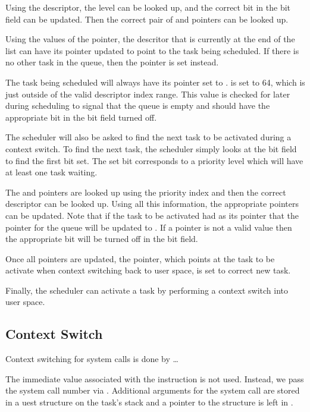 \documentclass[pdftex,10pt,a4paper]{article}
\begin{document}
Using the descriptor, the  level can be looked up, and
the correct bit in the bit field can be updated. Then the correct pair
of  and  pointers can be looked up.

Using the values of the  pointer, the descritor that is
currently at the end of the list can have its  pointer
updated to point to the task being scheduled. If there is no other
task in the queue, then the  pointer is set instead.

The task being scheduled will always have its  pointer set
to .  is set to 64, which is just
outside of the valid descriptor index range. This value is checked for
later during scheduling to signal that the queue is empty and should
have the appropriate bit in the bit field turned off.

The scheduler will also be asked to find the next task to be
activated during a context switch. To find the next task, the
scheduler simply looks at the bit field to find the first bit set. The
set bit corresponds to a priority level which will have at least one
task waiting.

The  and  pointers are looked up using the
priority index and then the correct descriptor can be looked up. Using
all this information, the appropriate pointers can be updated. Note
that if the task to be activated had  as its 
pointer that the  pointer for the queue will be updated to
. If a  pointer is not a valid value then the
appropriate bit will be turned off in the bit field.

Once all pointers are updated, the  pointer, which
points at the task to be activate when context switching back to user
space, is set to correct new task.

Finally, the scheduler can activate a task by performing a context
switch into user space.

\subsection*{Context Switch}

Context switching for system calls is done by \ldots

The immediate value associated with the  instruction is not
used. Instead, we pass the system call number via . Additional
arguments for the system call are stored in a uest
structure on the task's stack and a pointer to the structure is left
in .
\end{document}
